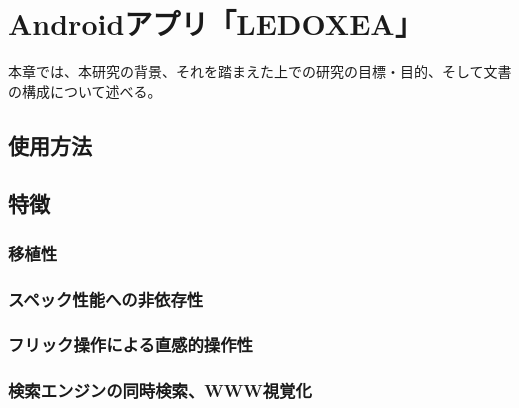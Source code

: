 \chapter{Androidアプリ「LEDOXEA」}
\label{chap:ledoxea}

本章では、本研究の背景、それを踏まえた上での研究の目標・目的、そして文書の構成について述べる。

\section{使用方法}


\section{特徴}

\subsection{移植性}

\subsection{スペック性能への非依存性}

\subsection{フリック操作による直感的操作性}

\subsection{検索エンジンの同時検索、WWW視覚化}


